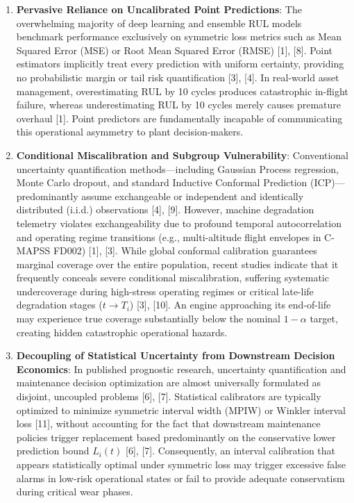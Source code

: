 \documentclass[12pt,a4paper]{article}
\begin{document}
\begin{enumerate}
    \item \textbf{Pervasive Reliance on Uncalibrated Point Predictions}: The overwhelming majority of deep learning and ensemble RUL models benchmark performance exclusively on symmetric loss metrics such as Mean Squared Error (MSE) or Root Mean Squared Error (RMSE) [1], [8]. Point estimators implicitly treat every prediction with uniform certainty, providing no probabilistic margin or tail risk quantification [3], [4]. In real-world asset management, overestimating RUL by 10 cycles produces catastrophic in-flight failure, whereas underestimating RUL by 10 cycles merely causes premature overhaul [1]. Point predictors are fundamentally incapable of communicating this operational asymmetry to plant decision-makers.
    \item \textbf{Conditional Miscalibration and Subgroup Vulnerability}: Conventional uncertainty quantification methods—including Gaussian Process regression, Monte Carlo dropout, and standard Inductive Conformal Prediction (ICP)—predominantly assume exchangeable or independent and identically distributed (i.i.d.) observations [4], [9]. However, machine degradation telemetry violates exchangeability due to profound temporal autocorrelation and operating regime transitions (e.g., multi-altitude flight envelopes in C-MAPSS FD002) [1], [3]. While global conformal calibration guarantees marginal coverage over the entire population, recent studies indicate that it frequently conceals severe conditional miscalibration, suffering systematic undercoverage during high-stress operating regimes or critical late-life degradation stages ($t \to T_i$) [3], [10]. An engine approaching its end-of-life may experience true coverage substantially below the nominal $1-\alpha$ target, creating hidden catastrophic operational hazards.
    \item \textbf{Decoupling of Statistical Uncertainty from Downstream Decision Economics}: In published prognostic research, uncertainty quantification and maintenance decision optimization are almost universally formulated as disjoint, uncoupled problems [6], [7]. Statistical calibrators are typically optimized to minimize symmetric interval width (MPIW) or Winkler interval loss [11], without accounting for the fact that downstream maintenance policies trigger replacement based predominantly on the conservative lower prediction bound $L_i(t)$ [6], [7]. Consequently, an interval calibration that appears statistically optimal under symmetric loss may trigger excessive false alarms in low-risk operational states or fail to provide adequate conservatism during critical wear phases.

\end{enumerate}
\end{document}
